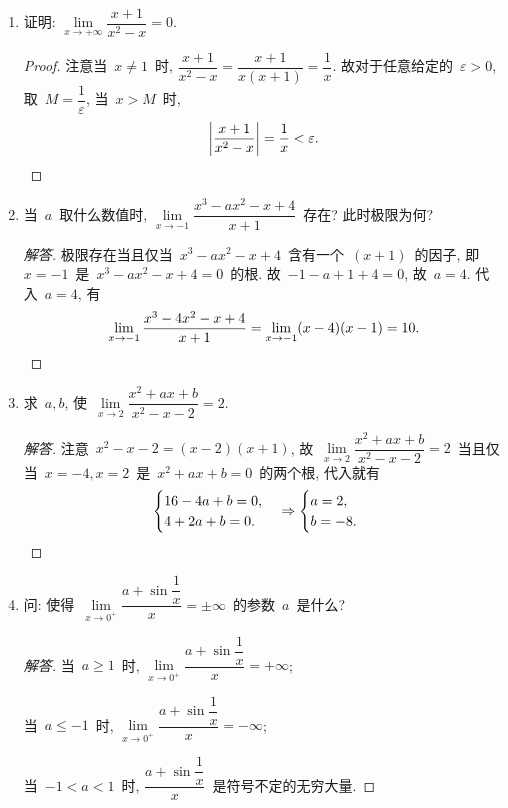 \documentclass[UTF8,a4paper,11pt,twoside]{book}
\begin{document}
\begin{enumerate}
	\item 证明: $\lim\limits_{x\to+\infty} \dfrac{x+1}{x^2-x}=0$.
	      \begin{proof}
		      注意当~$x\neq 1$~时, $\dfrac{x+1}{x^2-x}=\dfrac{x+1}{x(x+1)}=\dfrac{1}{x}$. 故对于任意给定的~$\varepsilon>0$, 取~$M=\dfrac{1}{\varepsilon}$, 当~$x>M$~时,
		      \[
			      \left|\dfrac{x+1}{x^2-x}\right|=\dfrac{1}{x}<\varepsilon. \qedhere
		      \]
	      \end{proof}

	\item 当~$a$~取什么数值时, $\lim\limits_{x\to -1} \dfrac{x^3-ax^2-x+4}{x+1}$~存在? 此时极限为何?
	      \begin{proof}[解答]
		      极限存在当且仅当~$x^3-ax^2-x+4$~含有一个~$(x+1)$~的因子, 即~$x=-1$~是~$x^3-ax^2-x+4=0$~的根. 故~$-1-a+1+4=0$, 故~$a=4$.
		      代入~$a=4$, 有
		      \[
			      \lim\limits_{x\to -1} \dfrac{x^3-4x^2-x+4}{x+1}=\lim\limits_{x\to -1} (x-4)(x-1)=10. \qedhere
		      \]
	      \end{proof}

	\item 求~$a,b$, 使~$\lim\limits_{x\to 2} \dfrac{x^2+ax+b}{x^2-x-2}=2$.
	      \begin{proof}[解答]
		      注意~$x^2-x-2=(x-2)(x+1)$, 故~$\lim\limits_{x\to 2} \dfrac{x^2+ax+b}{x^2-x-2}=2$~当且仅当~$x=-4, x=2$~是~$x^2+ax+b=0$~的两个根, 代入就有
		      \[
			      \begin{cases} 16-4a+b=0, \\ 4+2a+b=0. \end{cases} \Rightarrow \begin{cases} a=2,\\ b=-8. \end{cases} \qedhere
		      \]
	      \end{proof}

	\item 问: 使得~$\lim\limits_{x\to 0^{+}} \dfrac{a+\sin{\dfrac{1}{x}}}{x}=\pm\infty$~的参数~$a$~是什么?
	      \begin{proof}[解答]
		      当~$a\geqslant 1$~时, $\lim\limits_{x\to 0^{+}} \dfrac{a+\sin{\dfrac{1}{x}}}{x}=+\infty$;

		      当~$a\leqslant -1$~时, $\lim\limits_{x\to 0^{+}} \dfrac{a+\sin{\dfrac{1}{x}}}{x}=-\infty$;

		      当~$-1<a<1$~时, $\dfrac{a+\sin{\dfrac{1}{x}}}{x}$~是符号不定的无穷大量. \qedhere
	      \end{proof}


\end{enumerate}
\end{document}

